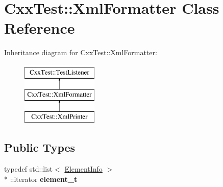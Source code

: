 \hypertarget{classCxxTest_1_1XmlFormatter}{\section{Cxx\-Test\-:\-:Xml\-Formatter Class Reference}
\label{classCxxTest_1_1XmlFormatter}
}
Inheritance diagram for Cxx\-Test\-:\-:Xml\-Formatter\-:\begin{figure}[H]
\begin{center}
\leavevmode
\includegraphics[height=3.000000cm]{classCxxTest_1_1XmlFormatter}
\end{center}
\end{figure}
\subsection*{Public Types}
\begin{DoxyCompactItemize}
\item 
\hypertarget{classCxxTest_1_1XmlFormatter_a2d7c3cc59d57128286c719c180dc553e}{typedef std\-::list$<$ \hyperlink{classCxxTest_1_1ElementInfo}{Element\-Info} $>$\\*
\-::iterator {\bfseries element\-\_\-t}}\label{classCxxTest_1_1XmlFormatter_a2d7c3cc59d57128286c719c180dc553e}

\end{DoxyCompactItemize}
